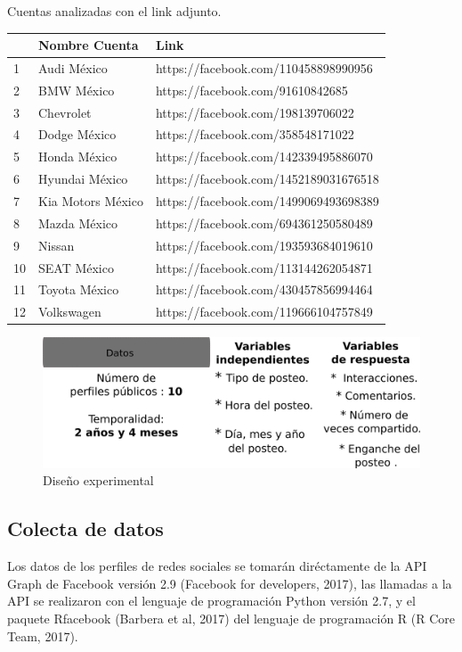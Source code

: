 \documentclass[a4paper,10pt]{article}
\begin{document}
\begin{center}
 {Cuentas analizadas con el link adjunto. } \\[0.3cm] 
{\footnotesize
   \begin{tabular} {l|l|l} 
    \hline
    & Nombre Cuenta & Link \\ 
    \hline
    1 & Audi México & https://facebook.com/110458898990956 \\
    2 & BMW México & https://facebook.com/91610842685 \\
    3 & Chevrolet & https://facebook.com/198139706022 \\
    4 & Dodge México & https://facebook.com/358548171022 \\
    5 & Honda México & https://facebook.com/142339495886070 \\
    6 & Hyundai México & https://facebook.com/1452189031676518  \\
    7 & Kia Motors México & https://facebook.com/1499069493698389 \\
    8 & Mazda México &  https://facebook.com/694361250580489 \\
    9 & Nissan &  https://facebook.com/193593684019610 \\
    10 & SEAT México & https://facebook.com/113144262054871 \\
    11 & Toyota México & https://facebook.com/430457856994464 \\
    12 & Volkswagen & https://facebook.com/119666104757849 \\
    \hline
    \end{tabular}
}
\end{center}





\begin{figure}[H]
  \begin{center}
   \includegraphics[width=.75\textwidth]{imagenes/figura1.png}
   \caption{Diseño experimental}
  \end{center} 
\end{figure}

\subsection{Colecta de datos}
Los datos de los perfiles de redes sociales se tomarán diréctamente de la API Graph de Facebook 
versión 2.9 (Facebook for developers, 2017), las llamadas a la API se realizaron con el lenguaje de programación Python
versión 2.7, y el paquete Rfacebook (Barbera et al, 2017) del lenguaje de programación R (R Core Team, 2017).
\end{document}
